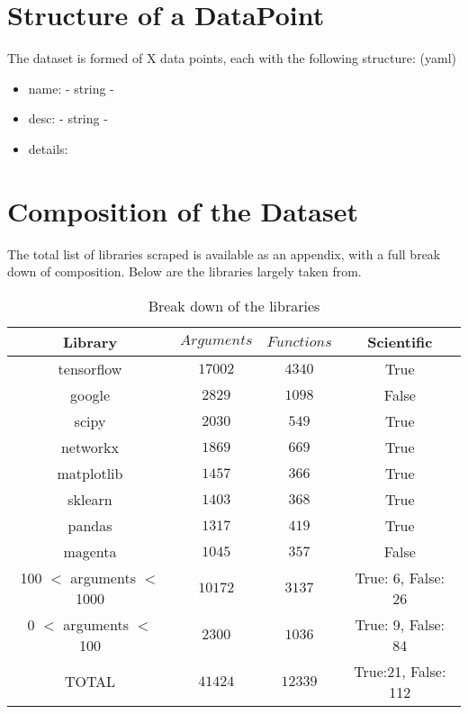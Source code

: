 
\section{Structure of a DataPoint} %
\label{sec:structure_of_datapoint}

The dataset is formed of X data points, each with the following structure: (yaml)
\begin{itemize}
    \item name: - string - 
    \item desc: - string - 
    \item details: 

\end{itemize}



\section{Composition of the Dataset} %
\label{sec:composition_of_the_dataset}

The total list of libraries scraped is available as an appendix, with a full break down of composition. Below are the libraries largely taken from. 

\begin{table}[h!]
    \begin{center}
    \begin{tabular}{c | c | c | c}
        Library      & $ Arguments $     & $ Functions $ & Scientific \\
    \hline
        tensorflow   & $ 17002 $     & $ 4340 $ & True \\
        google   & $ 2829 $      & $ 1098 $ & False \\
        scipy    & $ 2030 $      & $ 549 $ & True \\
        networkx     & $ 1869 $      & $ 669 $ & True \\
        matplotlib   & $ 1457 $      & $ 366 $ & True \\
        sklearn      & $ 1403 $      & $ 368 $ & True \\
        pandas   & $ 1317 $      & $ 419 $ & True \\
        magenta      & $ 1045 $      & $ 357 $ & False \\
        100 $<$ arguments $<$ 1000   & $ 10172 $     & $ 3137 $ & True: 6, False: 26 \\
        0 $<$ arguments $<$ 100      & $ 2300 $      & $ 1036 $ & True: 9, False: 84 \\
    \hline
    \hline
        TOTAL    & $ 41424 $     & $ 12339 $ & True:21, False: 112 \\
    \end{tabular}
    \caption {Break down of the libraries}
    \label{table:breakdown_by_library}
    \end{center}
\end{table}
